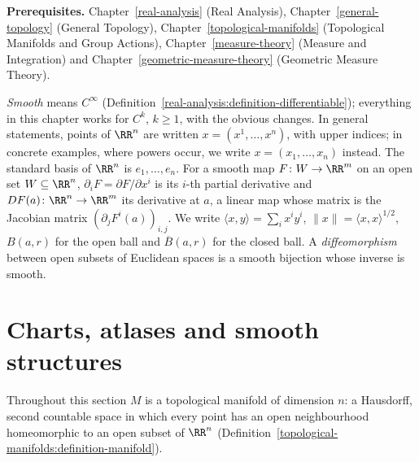 \noindent\textbf{Prerequisites.} Chapter~\ref{real-analysis} (Real Analysis), Chapter~\ref{general-topology} (General Topology),
Chapter~\ref{topological-manifolds} (Topological Manifolds and Group Actions),
Chapter~\ref{measure-theory} (Measure and Integration) and Chapter~\ref{geometric-measure-theory} (Geometric Measure Theory).

\begin{notation}\label{smooth-manifolds:notation-conventions}
\emph{Smooth} means $C^\infty$ (Definition~\ref{real-analysis:definition-differentiable}); everything in this chapter works for $C^k$, $k \geq 1$, with the
obvious changes. In general statements, points of $\RR^n$ are written $x = (x^1, \ldots, x^n)$, with upper indices; in concrete examples, where powers
occur, we write $x = (x_1, \ldots, x_n)$ instead. The standard basis of $\RR^n$ is $e_1, \ldots, e_n$. For a smooth map $F \colon W \to \RR^m$ on an open set
$W \subseteq \RR^n$, $\partial_iF = \partial F/\partial x^i$ is its $i$-th partial derivative and $DF(a) \colon \RR^n \to \RR^m$ its derivative at $a$, a linear
map whose matrix is the Jacobian matrix $(\partial_jF^i(a))_{i,j}$. We write $\langle x, y\rangle = \sum_ix^iy^i$, $\|x\| = \langle x, x\rangle^{1/2}$,
$B(a, r)$ for the open ball and $\overline{B}(a, r)$ for the closed ball. A \emph{diffeomorphism} between open subsets of Euclidean spaces is a smooth bijection
whose inverse is smooth.
\end{notation}

\section{Charts, atlases and smooth structures}\label{smooth-manifolds:section-manifolds}

Throughout this section $M$ is a topological manifold of dimension $n$: a Hausdorff, second countable space in which every point has an open neighbourhood
homeomorphic to an open subset of $\RR^n$ (Definition~\ref{topological-manifolds:definition-manifold}).

